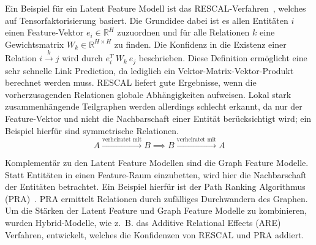 \documentclass[11pt, a4paper]{scrreprt}
\begin{document}
Ein Beispiel für ein Latent Feature Modell ist das RESCAL-Verfahren~\cite{nickel:2013}, welches auf Tensorfaktorisierung basiert.
Die Grundidee dabei ist es allen Entitäten $i$ einen Feature-Vektor $e_i \in \mathbb{R}^H$ zuzuordnen und für alle Relationen $k$ eine Gewichtsmatrix $W_k \in \mathbb{R}^{H \times H}$ zu finden.
Die Konfidenz in die Existenz einer Relation $i \xrightarrow{k} j$ wird durch $e_i^T\ W_k\ e_j$ beschrieben.
Diese Definition ermöglicht eine sehr schnelle Link Prediction, da lediglich ein Vektor-Matrix-Vektor-Produkt berechnet werden muss.
RESCAL liefert gute Ergebnisse, wenn die vorherzusagenden Relationen globale Abhängigkeiten aufweisen.
Lokal stark zusammenhängende Teilgraphen werden allerdings schlecht erkannt, da nur der Feature-Vektor und nicht die Nachbarschaft einer Entität berücksichtigt wird;
ein Beispiel hierfür sind symmetrische Relationen.
$$A \xrightarrow{\text{verheiratet mit}} B \implies B \xrightarrow{\text{verheiratet mit}} A$$

Komplementär zu den Latent Feature Modellen sind die Graph Feature Modelle.
Statt Entitäten in einen Feature-Raum einzubetten, wird hier die Nachbarschaft der Entitäten betrachtet.
Ein Beispiel hierfür ist der Path Ranking Algorithmus (PRA)~\cite{lao:2011}. PRA ermittelt Relationen durch zufälliges Durchwandern des Graphen.
Um die Stärken der Latent Feature und Graph Feature Modelle zu kombinieren, wurden Hybrid-Modelle, wie z.~B. das Additive Relational Effects (ARE)~\cite{nickel:2014} Verfahren, entwickelt, welches die Konfidenzen von RESCAL und PRA addiert.\\
\end{document}
